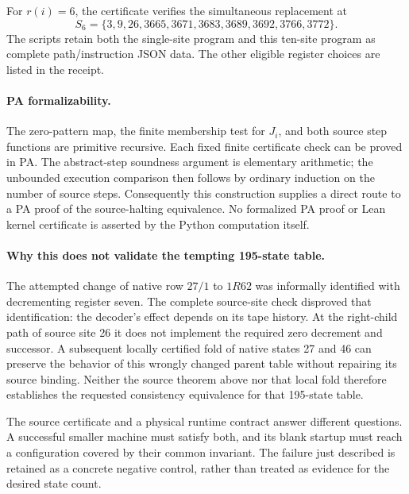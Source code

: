 For $r(i)=6$, the certificate verifies the simultaneous replacement at
\[
 S_6=\{3,9,26,3665,3671,3683,3689,3692,3766,3772\}.
\]
The scripts retain both the single-site program and this ten-site
program as complete path/instruction JSON data. The other eligible
register choices are listed in the receipt.

\paragraph{PA formalizability.}
The zero-pattern map, the finite membership test for $J_i$, and both
source step functions are primitive recursive. Each fixed finite
certificate check can be proved in PA. The abstract-step soundness
argument is elementary arithmetic; the unbounded execution comparison
then follows by ordinary induction on the number of source steps.
Consequently this construction supplies a direct route to a PA proof
of the source-halting equivalence. No formalized PA proof or Lean
kernel certificate is asserted by the Python computation itself.

\paragraph{Why this does not validate the tempting 195-state table.}
The attempted change of native row $27/1$ to $1R62$ was informally
identified with decrementing register seven. The complete source-site
check disproved that identification: the decoder's effect depends on
its tape history. At the right-child path of source site 26 it does not
implement the required zero decrement and successor. A subsequent
locally certified fold of native states 27 and 46 can preserve the
behavior of this wrongly changed parent table without repairing its
source binding. Neither the source theorem above nor that local fold
therefore establishes the requested consistency equivalence for that
195-state table.

The source certificate and a physical runtime contract answer different
questions. A successful smaller machine must satisfy both, and its
blank startup must reach a configuration covered by their common
invariant. The failure just described is retained as a concrete negative
control, rather than treated as evidence for the desired state count.
